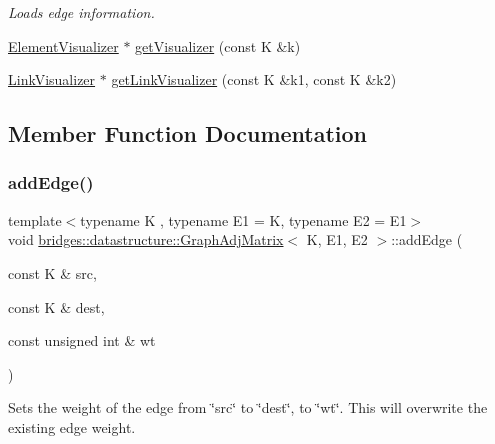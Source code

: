 \begin{DoxyCompactItemize}
\begin{DoxyCompactList}\small\item\em Loads edge information. \end{DoxyCompactList}\item 
\hyperlink{classbridges_1_1datastructure_1_1_element_visualizer}{Element\+Visualizer} $\ast$ \hyperlink{classbridges_1_1datastructure_1_1_graph_adj_matrix_ad17ebd77b7fd42bd440aa5bbf313c752}{get\+Visualizer} (const K \&k)
\item 
\hyperlink{classbridges_1_1datastructure_1_1_link_visualizer}{Link\+Visualizer} $\ast$ \hyperlink{classbridges_1_1datastructure_1_1_graph_adj_matrix_ab41a062af77b11e5cc034f7c21d12421}{get\+Link\+Visualizer} (const K \&k1, const K \&k2)
\end{DoxyCompactItemize}


\subsection{Member Function Documentation}
\mbox{\label{classbridges_1_1datastructure_1_1_graph_adj_matrix_ab23870ac203b3784157ecb05443494a4}} 
\subsubsection{\texorpdfstring{add\+Edge()}{addEdge()}}
{\footnotesize\ttfamily template$<$typename K , typename E1  = K, typename E2  = E1$>$ \\
void \hyperlink{classbridges_1_1datastructure_1_1_graph_adj_matrix}{bridges\+::datastructure\+::\+Graph\+Adj\+Matrix}$<$ K, E1, E2 $>$\+::add\+Edge (\begin{DoxyParamCaption}\item[{const K \&}]{src,  }\item[{const K \&}]{dest,  }\item[{const unsigned int \&}]{wt }\end{DoxyParamCaption})\hspace{0.3cm}{\ttfamily [inline]}}

Sets the weight of the edge from \char`\"{}src\char`\"{} to \char`\"{}dest\char`\"{}, to \char`\"{}wt\char`\"{}. This will overwrite the existing edge weight.


